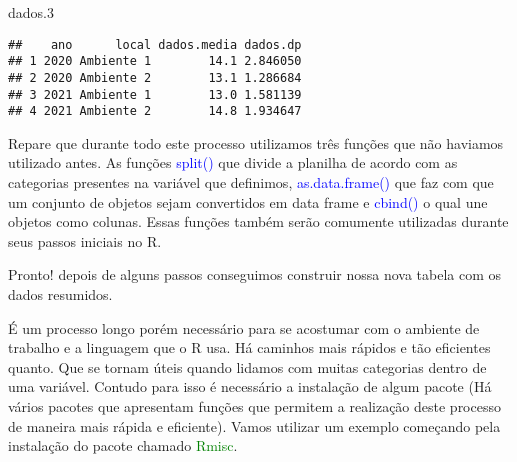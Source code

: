 \documentclass[titlepage, oneside, openany, a4paper]{book}
\newenvironment{Shaded}{\begin{snugshade}}{\end{snugshade}}
\newcommand{\FloatTok}[1]{\textcolor[rgb]{0.00,0.00,0.81}{#1}}
\newcommand{\KeywordTok}[1]{\textcolor[rgb]{0.13,0.29,0.53}{\textbf{#1}}}
\newcommand{\NormalTok}[1]{#1}
\newcommand{\OperatorTok}[1]{\textcolor[rgb]{0.81,0.36,0.00}{\textbf{#1}}}
\newcommand{\StringTok}[1]{\textcolor[rgb]{0.31,0.60,0.02}{#1}}
\begin{document}
\begin{Shaded}
\end{Shaded}

\begin{Shaded}
\begin{Highlighting}[]
\NormalTok{dados}\FloatTok{.3}
\end{Highlighting}
\end{Shaded}

\begin{verbatim}
##    ano      local dados.media dados.dp
## 1 2020 Ambiente 1        14.1 2.846050
## 2 2020 Ambiente 2        13.1 1.286684
## 3 2021 Ambiente 1        13.0 1.581139
## 4 2021 Ambiente 2        14.8 1.934647
\end{verbatim}

Repare que durante todo este processo utilizamos três funções que não haviamos utilizado antes. As funções \textcolor{blue}{split()} que divide a planilha de acordo com as categorias presentes na variável que definimos, \textcolor{blue}{as.data.frame()} que faz com que um conjunto de objetos sejam convertidos em data frame e \textcolor{blue}{cbind()} o qual une objetos como colunas. Essas funções também serão comumente utilizadas durante seus passos iniciais no R.

Pronto! depois de alguns passos conseguimos construir nossa nova tabela com os dados resumidos.

É um processo longo porém necessário para se acostumar com o ambiente de trabalho e a linguagem que o R usa. Há caminhos mais rápidos e tão eficientes quanto. Que se tornam úteis quando lidamos com muitas categorias dentro de uma variável. Contudo para isso é necessário a instalação de algum pacote (Há vários pacotes que apresentam funções que permitem a realização deste processo de maneira mais rápida e eficiente). Vamos utilizar um exemplo começando pela instalação do pacote chamado \textcolor{green}{Rmisc}.
\end{document}
